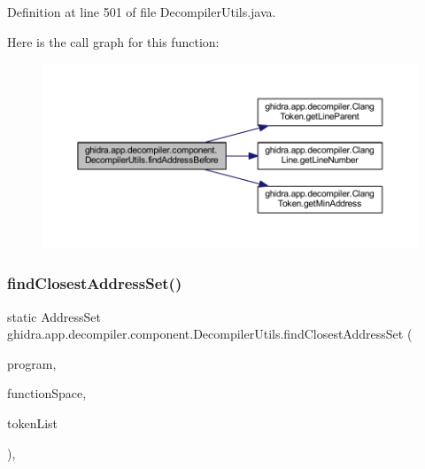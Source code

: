 Definition at line 501 of file Decompiler\+Utils.\+java.

Here is the call graph for this function\+:
\nopagebreak
\begin{figure}[H]
\begin{center}
\leavevmode
\includegraphics[width=350pt]{classghidra_1_1app_1_1decompiler_1_1component_1_1_decompiler_utils_a39ad1c993402acb5e7e67ecf56eccd3b_cgraph}
\end{center}
\end{figure}
\mbox{\label{classghidra_1_1app_1_1decompiler_1_1component_1_1_decompiler_utils_ac1c3357b8ea5189690396dbde0caca60}} 
\subsubsection{\texorpdfstring{findClosestAddressSet()}{findClosestAddressSet()}}
{\footnotesize\ttfamily static Address\+Set ghidra.\+app.\+decompiler.\+component.\+Decompiler\+Utils.\+find\+Closest\+Address\+Set (\begin{DoxyParamCaption}\item[{Program}]{program,  }\item[{Address\+Space}]{function\+Space,  }\item[{\mbox{\hyperlink{xml_8hh_ab5ab62f46b3735557c125f91b40ac155}{List}}$<$ \mbox{\hyperlink{classghidra_1_1app_1_1decompiler_1_1_clang_token}{Clang\+Token}} $>$}]{token\+List }\end{DoxyParamCaption})\hspace{0.3cm}{\ttfamily [inline]}, {\ttfamily [static]}}



